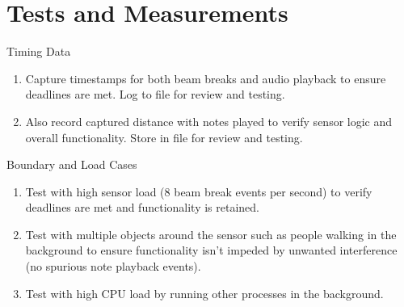 \documentclass[
11pt,notheorems,hyperref={pdfauthor=whatever}
]{beamer}
\begin{document}
\section{Tests and Measurements}
\begin{frame}

\begin{block}{Timing Data}
\begin{enumerate}
    \item Capture timestamps for both beam breaks
        and audio playback to ensure deadlines are
        met. Log to file for review and testing.
    \item Also record captured distance with notes
        played to verify sensor logic and overall
        functionality. Store in file for review and
        testing.
\end{enumerate}
\end{block}

\begin{block}{Boundary and Load Cases}
\begin{enumerate}
    \item Test with high sensor load (8 beam break
        events per second) to verify deadlines are met
        and functionality is retained.
    \item Test with multiple objects around the sensor
        such as people walking in the background to
        ensure functionality isn't impeded by unwanted
        interference (no spurious note playback
        events).
    \item Test with high CPU load by running other
        processes in the background.
\end{enumerate}
\end{block}

\end{frame}
\end{document}
